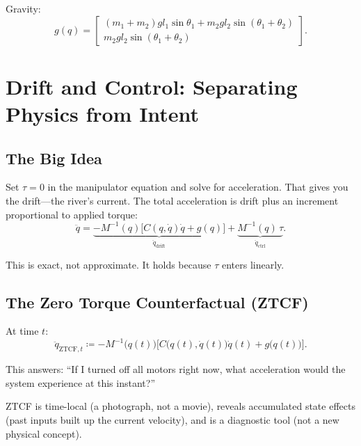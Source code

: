 \documentclass[11pt]{article}
\begin{document}
Gravity:
\begin{equation}\label{eq:dp-gravity}
g(q) = \begin{bmatrix}
(m_1+m_2)gl_1\sin\theta_1 + m_2gl_2\sin(\theta_1+\theta_2) \\
m_2gl_2\sin(\theta_1+\theta_2)
\end{bmatrix}.
\end{equation}


\section{Drift and Control: Separating Physics from Intent}\label{sec:drift-control}

\subsection{The Big Idea}

Set $\tau = 0$ in the manipulator equation and solve for acceleration. That gives you the drift---the river's current. The total acceleration is drift plus an increment proportional to applied torque:
\begin{equation}\label{eq:el-drift-control}
\ddot{q} = \underbrace{-M^{-1}(q)\bigl[C(q,\dot{q})\dot{q} + g(q)\bigr]}_{\ddot{q}_{\mathrm{drift}}} + \underbrace{M^{-1}(q)\,\tau}_{\ddot{q}_{\mathrm{ctrl}}}.
\end{equation}

This is exact, not approximate. It holds because $\tau$ enters linearly.

\subsection{The Zero Torque Counterfactual (ZTCF)}

At time $t$:
\begin{equation}\label{eq:ztcf-def}
\ddot{q}_{\mathrm{ZTCF},t} \coloneqq -M^{-1}\bigl(q(t)\bigr)\bigl[C\bigl(q(t),\dot{q}(t)\bigr)\dot{q}(t) + g\bigl(q(t)\bigr)\bigr].
\end{equation}

This answers: ``If I turned off all motors right now, what acceleration would the system experience at this instant?''

ZTCF is time-local (a photograph, not a movie), reveals accumulated state effects (past inputs built up the current velocity), and is a diagnostic tool (not a new physical concept).
\end{document}
